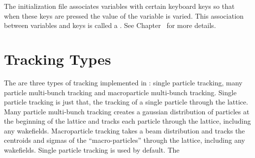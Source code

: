 The  initialization file associates variables with
certain keyboard keys so that when these keys are pressed the value of
the variable is varied. This association between variables and keys is
called a . See Chapter~ for more details.

\section{Tracking Types}

The are three types of tracking implemented in \tao: single particle
tracking, many particle multi-bunch tracking and macroparticle
multi-bunch tracking. Single particle tracking is just that, the
tracking of a single particle through the lattice. Many particle
multi-bunch tracking creates a gaussian distribution of particles at
the beginning of the lattice and tracks each particle through the
lattice, including any wakefields. Macroparticle tracking takes a beam
distribution and tracks the centroids and sigmas of the
``macro-particles'' through the lattice, including any wakefields.
Single particle tracking is used by default. The
